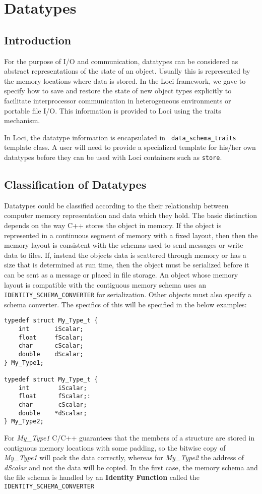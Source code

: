 \chapter{Datatypes}
%
\section {Introduction}
For the purpose of I/O and communication, datatypes can be considered
as abstract representations of the state of an object.  Usually this
is represented by the memory locations where data is stored.  In the
Loci framework, we gave to specify how to save and restore the state
of new object types explicitly to facilitate interprocessor
communication in heterogeneous environments or portable file I/O.
This information is provided to Loci using the traits mechanism.

In Loci, the datatype information is encapsulated in {\tt
  data\_schema\_traits} template class.  A user will need to provide a
specialized template for his/her own datatypes before they can be
used with Loci containers such as {\tt store}.
%
\section {Classification of Datatypes} 

Datatypes could be classified according to the their relationship
between computer memory representation and data which they hold.  The
basic distinction depends on the way C++ stores the object in memory.
If the object is represented in a continuous segment of memory with a
fixed layout, then then the memory layout is consistent with the
schemas used to send messages or write data to files.  If, instead the
objects data is scattered through memory or has a size that is
determined at run time, then the object must be serialized before it
can be sent as a message or placed in file storage.  An object whose
memory layout is compatible with the contiguous memory schema uses an
{\tt IDENTITY\_SCHEMA\_CONVERTER} for serialization.  Other objects
must also specify a schema converter.  The specifics of this will be
specified in the below examples:
%
\begin {verbatim}
typedef struct My_Type_t {
    int       iScalar;
    float     fScalar;
    char      cScalar;
    double    dScalar;
} My_Type1;

typedef struct My_Type_t {
    int        iScalar;
    float      fScalar;:
    char       cScalar;
    double    *dScalar;
} My_Type2;
\end{verbatim}
%
For {\em My\_Type1} C/C++ guarantees that the members of a structure
are stored in contiguous memory locations with some padding, so the
bitwise copy of {\em My\_Type1} will pack the data correctly, whereas
for {\em My\_Type2} the address of {\em dScalar} and not the data will
be copied. In the first case, the memory schema and the file schema is
handled by an {\bf Identity Function} called the {\tt
  IDENTITY\_SCHEMA\_CONVERTER }

